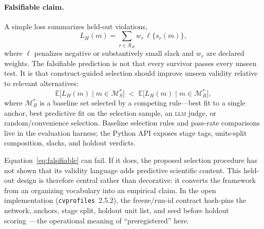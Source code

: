 \documentclass[10pt,letterpaper]{article}
\newcommand{\LLM}{\textsc{llm}}
\newcommand{\cvp}{\texttt{cvprofiles}}
\newcommand{\M}{\ensuremath{\mathcal{M}}}
\newcommand{\E}{\mathbb{E}}
\newcommand{\Rset}{\mathcal{R}}
\begin{document}
\paragraph{Falsifiable claim.}
A simple loss summarizes held-out violations,
\begin{equation}
L_H(m)=\sum_{r\in\Rset_H} w_r\,\ell\bigl\{s_r(m)\bigr\},
\label{eq:LH}
\end{equation}
where $\ell$ penalizes negative or substantively small slack and $w_r$ are declared weights.
The falsifiable prediction is not that every survivor passes every unseen test.
It is that construct-guided selection should improve unseen validity relative to relevant alternatives:
\begin{equation}
\E\bigl[L_H(m)\mid m\in\M^*_S\bigr]
\;<\;
\E\bigl[L_H(m)\mid m\in\M^*_B\bigr],
\label{eq:falsifiable}
\end{equation}
where $\M^*_B$ is a baseline set selected by a competing rule---best fit to a single anchor, best predictive fit on the selection sample, an \LLM{} judge, or random/convenience selection.
Baseline selection rules and pass-rate comparisons live in the evaluation harness; the Python API exposes stage tags, units-split composition, slacks, and holdout verdicts.

Equation~\eqref{eq:falsifiable} can fail.
If it does, the proposed selection procedure has not shown that its validity language adds predictive scientific content.
This held-out design is therefore central rather than decorative: it converts the framework from an organizing vocabulary into an empirical claim.
In the open implementation (\cvp{}~2.5.2), the freeze/run-id contract hash-pins the network, anchors, stage split, holdout unit list, and seed before holdout scoring~\cite{cvprofiles}---the operational meaning of ``preregistered'' here.
\end{document}
